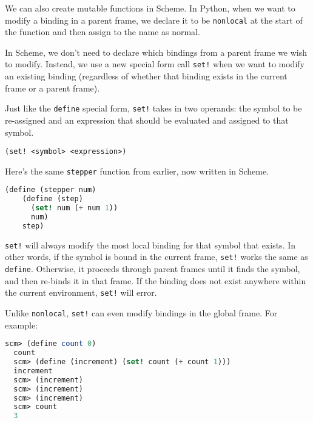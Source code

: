 We can also create mutable functions in Scheme. In Python, when we want to
modify a binding in a parent frame, we declare it to be {\tt nonlocal} at the
start of the function and then assign to the name as normal.

In Scheme, we don't need to declare which bindings from a parent frame we wish
to modify. Instead, we use a new special form call {\tt set!} when we want to
modify an existing binding (regardless of whether that binding exists in the
current frame or a parent frame).

Just like the {\tt define} special form, {\tt set!} takes in two operands: the
symbol to be re-assigned and an expression that should be evaluated and assigned
to that symbol.

\centerline{\lstinline{(set! <symbol> <expression>)}}

Here's the same {\tt stepper} function from earlier, now written in Scheme.

\begin{lstlisting}[language=Scheme]
  (define (stepper num)
    (define (step)
      (set! num (+ num 1))
      num)
    step)
\end{lstlisting}

{\tt set!} will always modify the most local binding for that symbol that
exists. In other words, if the symbol is bound in the current frame, {\tt set!}
works the same as {\tt define}. Otherwise, it proceeds through parent frames
until it finds the symbol, and then re-binds it in that frame. If the binding
does not exist anywhere within the current environment, {\tt set!} will error.

Unlike {\tt nonlocal}, {\tt set!} can even modify bindings in the global frame.
For example:

\begin{lstlisting}[language=Scheme]
  scm> (define count 0)
  count
  scm> (define (increment) (set! count (+ count 1)))
  increment
  scm> (increment)
  scm> (increment)
  scm> (increment)
  scm> count
  3
\end{lstlisting}
